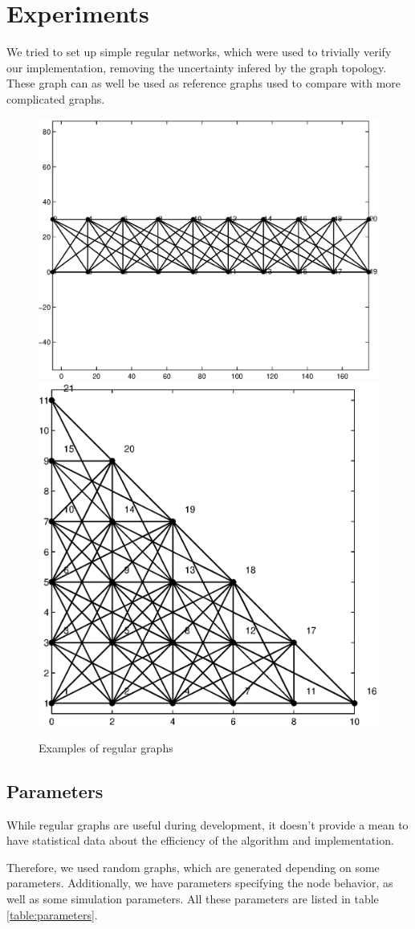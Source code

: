 \documentclass[letterpaper, 10 pt, conference]{ieeeconf}  %
\begin{document}
\section{Experiments}

We tried to set up simple regular networks, which were used to trivially verify our implementation, removing the uncertainty infered by the graph topology. These graph can as well be used as reference graphs used to compare with more complicated graphs.\newline


\begin{figure}[ht!]
\centering
\includegraphics[width=0.4\columnwidth]{reg1.eps} \includegraphics[width=0.4\columnwidth]{reg3.eps}
\caption{Examples of regular graphs}
\end{figure}

\subsection{Parameters}

While regular graphs are useful during development, it doesn't provide a mean to have statistical data about the efficiency of the algorithm and implementation.

Therefore, we used random graphs, which are generated depending on some parameters. Additionally, we have parameters specifying the node behavior, as well as some simulation parameters. All these parameters are listed in table \ref{table:parameters}.
\end{document}
